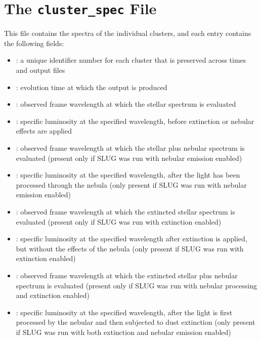 \documentclass[letterpaper,10pt,english]{sphinxmanual}
\begin{document}
\section{The \texttt{cluster\_spec} File}
\label{output:the-cluster-spec-file}
This file contains the spectra of the individual clusters, and each entry contains the following fields:
\begin{itemize}
\item {} 
: a unique identifier number for each cluster that is preserved across times and output files

\item {} 
: evolution time at which the output is produced

\item {} 
: observed frame wavelength at which the stellar spectrum is evaluated

\item {} 
: specific luminosity at the specified wavelength, before extinction or nebular effects are applied

\item {} 
: observed frame wavelength at which the stellar plus nebular spectrum is evaluated (present only if SLUG was run with nebular emission enabled)

\item {} 
: specific luminosity at the specified wavelength, after the light has been processed through the nebula (only present if SLUG was run with nebular emission enabled)

\item {} 
: observed frame wavelength at which the extincted stellar spectrum is evaluated (present only if SLUG was run with extinction enabled)

\item {} 
: specific luminosity at the specified wavelength after extinction is applied, but without the effects of the nebula (only present if SLUG was run with extinction enabled)

\item {} 
: observed frame wavelength at which the extincted stellar plus nebular spectrum is evaluated (present only if SLUG was run with nebular processing and  extinction enabled)

\item {} 
: specific luminosity at the specified wavelength, after the light is first processed by the nebular and then subjected to dust extinction (only present if SLUG was run with both extinction and nebular emission enabled)

\end{itemize}
\end{document}
